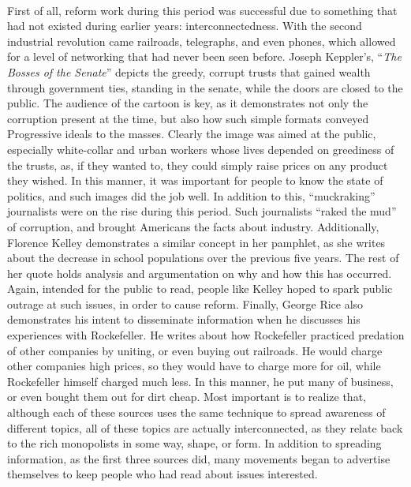 \documentclass[12pt]{article}
\begin{document}
\paragraph{} First of all, reform work during this period was successful due to something that had not existed during earlier years: interconnectedness. With the second industrial revolution came railroads, telegraphs, and even phones, which allowed for a level of networking that had never been seen before. Joseph Keppler's, ``\textit{The Bosses of the Senate}'' depicts the greedy, corrupt trusts that gained wealth through government ties, standing in the senate, while the doors are closed to the public. The audience of the cartoon is key, as it demonstrates not only the corruption present at the time, but also how such simple formats conveyed Progressive ideals to the masses. Clearly the image was aimed at the public, especially white-collar and urban workers whose lives depended on greediness of the trusts, as, if they wanted to, they could simply raise prices on any product they wished. In this manner, it was important for people to know the state of politics, and such images did the job well. In addition to this, ``muckraking'' journalists were on the rise during this period. Such journalists ``raked the mud'' of corruption, and brought Americans the facts about industry. Additionally, Florence Kelley demonstrates a similar concept in her pamphlet, as she writes about the decrease in school populations over the previous five years. The rest of her quote holds analysis and argumentation on why and how this has occurred. Again, intended for the public to read, people like Kelley hoped to spark public outrage at such issues, in order to cause reform. Finally, George Rice also demonstrates his intent to disseminate information when he discusses his experiences with Rockefeller. He writes about how Rockefeller practiced predation of other companies by uniting, or even buying out railroads. He would charge other companies high prices, so they would have to charge more for oil, while Rockefeller himself charged much less. In this manner, he put many of business, or even bought them out for dirt cheap. Most important is to realize that, although each of these sources uses the same technique to spread awareness of different topics, all of these topics are actually interconnected, as they relate back to the rich monopolists in some way, shape, or form. In addition to spreading information, as the first three sources did, many movements began to advertise themselves to keep people who had read about issues interested.
\end{document}
